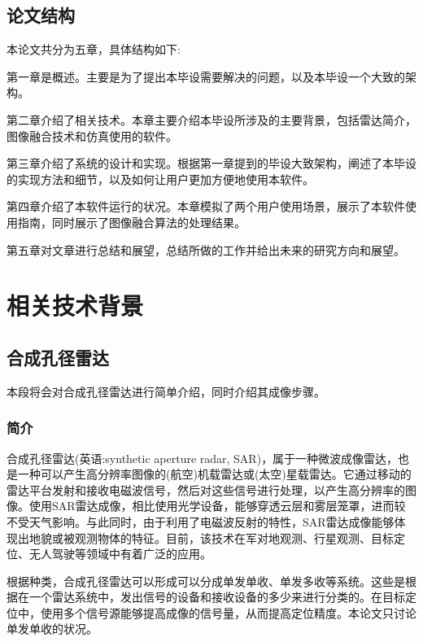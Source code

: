 \documentclass{xduugthesis}
\begin{document}
\section{论文结构}
本论文共分为五章，具体结构如下:\par
第一章是概述。主要是为了提出本毕设需要解决的问题，以及本毕设一个大致的架构。\par
第二章介绍了相关技术。本章主要介绍本毕设所涉及的主要背景，包括雷达简介，图像融合技术和仿真使用的软件。\par
第三章介绍了系统的设计和实现。根据第一章提到的毕设大致架构，阐述了本毕设的实现方法和细节，以及如何让用户更加方便地使用本软件。\par
第四章介绍了本软件运行的状况。本章模拟了两个用户使用场景，展示了本软件使用指南，同时展示了图像融合算法的处理结果。\par
第五章对文章进行总结和展望，总结所做的工作并给出未来的研究方向和展望。
\chapter{相关技术背景}
\section{合成孔径雷达}
本段将会对合成孔径雷达进行简单介绍，同时介绍其成像步骤。
\subsection{简介}
合成孔径雷达(英语:synthetic aperture radar, SAR)\cite{SAR_Introduction}，属于一种微波成像雷达，也是一种可以产生高分辨率图像的(航空)机载雷达或(太空)星载雷达。它通过移动的雷达平台发射和接收电磁波信号，然后对这些信号进行处理，以产生高分辨率的图像。使用SAR雷达成像，相比使用光学设备，能够穿透云层和雾层笼罩，进而较不受天气影响。与此同时，由于利用了电磁波反射的特性，SAR雷达成像能够体现出地貌或被观测物体的特征。目前，该技术在军对地观测、行星观测、目标定位、无人驾驶等领域中有着广泛的应用。\par
根据种类，合成孔径雷达可以形成可以分成单发单收、单发多收等系统。这些是根据在一个雷达系统中，发出信号的设备和接收设备的多少来进行分类的。在目标定位中，使用多个信号源能够提高成像的信号量，从而提高定位精度。本论文只讨论单发单收的状况。
\end{document}
